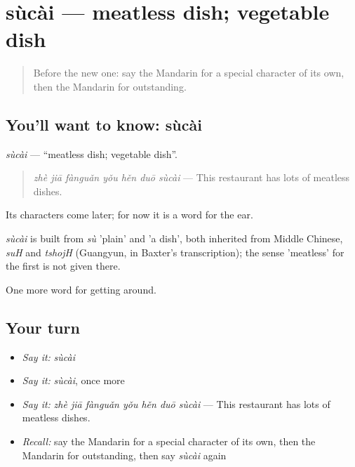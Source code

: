 \section[sùcài]{sùcài — meatless dish; vegetable dish}

\label{lesson:ZH-C451-sucai}



\begin{quote}
Before the new one: say the Mandarin for a special character of its own, then the Mandarin for outstanding.
\end{quote}

\subsection*{You'll want to know: sùcài}
\emph{sùcài} — \textquotedblleft{}meatless dish; vegetable dish\textquotedblright{}.

\begin{quote}
\emph{zhè jiā fànguǎn yǒu hěn duō sùcài} — This restaurant has lots of meatless dishes.
\end{quote}

Its characters come later; for now it is a word for the ear.

\begin{cousinweb}
\emph{sùcài} is built from \emph{sù} 'plain' and  'a dish', both inherited from Middle Chinese, \emph{suH} and \emph{tshojH} (Guangyun, in Baxter's transcription); the sense 'meatless' for the first is not given there.
\end{cousinweb}

\begin{grammarlens}[title={What you've built}]
One more word for getting around.
\end{grammarlens}

\subsection*{Your turn}
\begin{itemize}
\raggedright
  \item \emph{Say it:} \emph{sùcài}
  \item \emph{Say it:} \emph{sùcài}, once more
  \item \emph{Say it:} \emph{zhè jiā fànguǎn yǒu hěn duō sùcài} — This restaurant has lots of meatless dishes.
  \item \emph{Recall:} say the Mandarin for a special character of its own, then the Mandarin for outstanding, then say \emph{sùcài} again
\end{itemize}

